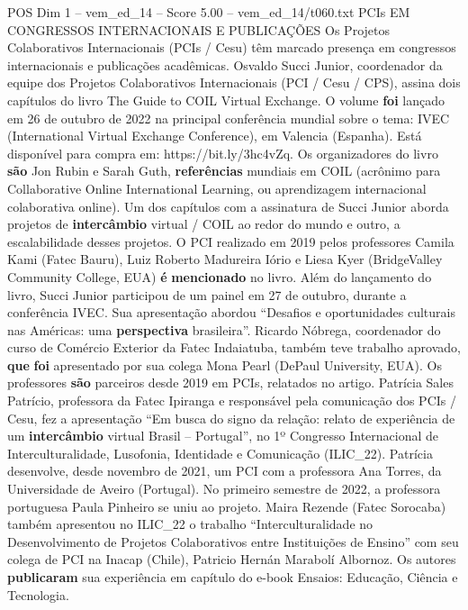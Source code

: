 \begin{textsample}{POS Dim 1 – vem\_ed\_14 – Score 5.00 – vem\_ed\_14/t060.txt}  \label{ex:f1_pos_153}
PCIs EM CONGRESSOS INTERNACIONAIS E PUBLICAÇÕES Os Projetos Colaborativos Internacionais (PCIs / Cesu) têm marcado presença em congressos internacionais e publicações acadêmicas.
Osvaldo Succi Junior, coordenador da equipe dos Projetos Colaborativos Internacionais (PCI / Cesu / CPS), assina dois capítulos do livro The Guide to COIL Virtual Exchange.
O volume \textbf{foi} lançado em 26 de outubro de 2022 na principal conferência mundial sobre o tema: IVEC (International Virtual Exchange Conference), em Valencia (Espanha).
Está disponível para compra em: https://bit.ly/3hc4vZq.
Os organizadores do livro \textbf{são} Jon Rubin e Sarah Guth, \textbf{referências} mundiais em COIL (acrônimo para Collaborative Online International Learning, ou aprendizagem internacional colaborativa online).
Um dos capítulos com a assinatura de Succi Junior aborda projetos de \textbf{intercâmbio} virtual / COIL ao redor do mundo e outro, a escalabilidade desses projetos.
O PCI realizado em 2019 pelos professores Camila Kami (Fatec Bauru), Luiz Roberto Madureira Iório e Liesa Kyer (BridgeValley Community College, EUA) \textbf{é} \textbf{mencionado} no livro.
Além do lançamento do livro, Succi Junior participou de um painel em 27 de outubro, durante a conferência IVEC.
Sua apresentação abordou “Desafios e oportunidades culturais nas Américas: uma \textbf{perspectiva} brasileira”.
Ricardo Nóbrega, coordenador do curso de Comércio Exterior da Fatec Indaiatuba, também teve trabalho aprovado, \textbf{que} \textbf{foi} apresentado por sua colega Mona Pearl (DePaul University, EUA).
Os professores \textbf{são} parceiros desde 2019 em PCIs, relatados no artigo.
Patrícia Sales Patrício, professora da Fatec Ipiranga e responsável pela comunicação dos PCIs / Cesu, fez a apresentação “Em busca do signo da relação: relato de experiência de um \textbf{intercâmbio} virtual Brasil – Portugal”, no 1º Congresso Internacional de Interculturalidade, Lusofonia, Identidade e Comunicação (ILIC\_22).
Patrícia desenvolve, desde novembro de 2021, um PCI com a professora Ana Torres, da Universidade de Aveiro (Portugal).
No primeiro semestre de 2022, a professora portuguesa Paula Pinheiro se uniu ao projeto.
Maira Rezende (Fatec Sorocaba) também apresentou no ILIC\_22 o trabalho “Interculturalidade no Desenvolvimento de Projetos Colaborativos entre Instituições de Ensino” com seu colega de PCI na Inacap (Chile), Patricio Hernán Marabolí Albornoz.
Os autores \textbf{publicaram} sua experiência em capítulo do e-book Ensaios: Educação, Ciência e Tecnologia.

\end{textsample}

